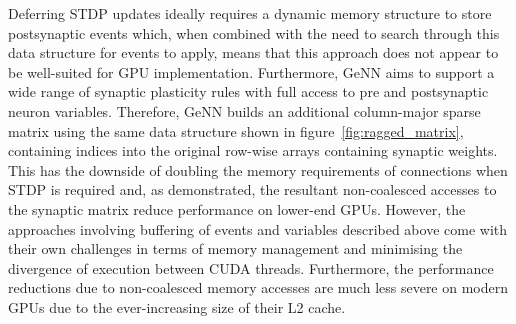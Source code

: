 \documentclass[utf8]{frontiersSCNS} %
\begin{document}
Deferring STDP updates ideally requires a dynamic memory structure to store postsynaptic events which, when combined with the need to search through this data structure for events to apply, means that this approach does not appear to be well-suited for GPU implementation.
Furthermore, GeNN aims to support a wide range of synaptic plasticity rules with full access to pre and postsynaptic neuron variables.
Therefore, GeNN builds an additional column-major sparse matrix using the same data structure shown in figure~\ref{fig:ragged_matrix}, containing indices into the original row-wise arrays containing synaptic weights.
This has the downside of doubling the memory requirements of connections when STDP is required and, as \citet{Yavuz2016} demonstrated, the resultant non-coalesced accesses to the synaptic matrix reduce performance on lower-end GPUs. 
However, the approaches involving buffering of events and variables described above come with their own challenges in terms of memory management and minimising the divergence of execution between CUDA threads.
Furthermore, the performance reductions due to non-coalesced memory accesses are much less severe on modern GPUs due to the ever-increasing size of their L2 cache.
\end{document}
